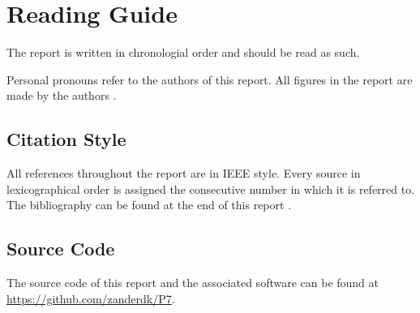 \chapter*{Reading Guide}
The report is written in chronologial order and should be read as such. 

Personal pronouns refer to the authors of this report. All figures in the report are made by the authors .

\section*{Citation Style}
All references throughout the report are in IEEE style. Every source in lexicographical order is assigned the consecutive number in which it is referred to. The bibliography can be found at the end of this report .

\section*{Source Code}
The source code of this report and the associated software can be found at \url{https://github.com/zanderdk/P7}.